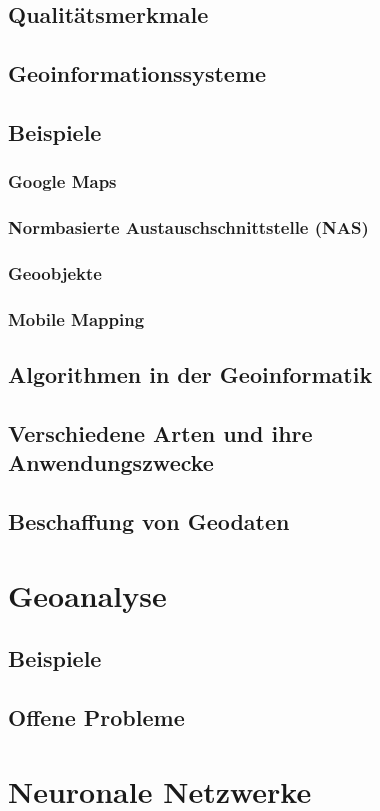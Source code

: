 \documentclass[11pt,fleqn]{book} %
\begin{document}
\section{Qualitätsmerkmale}
\section{Geoinformationssysteme}
\section{Beispiele}
\subsection{Google Maps}
\subsection{Normbasierte Austauschschnittstelle (NAS)}
\subsection{Geoobjekte}
\subsection{Mobile Mapping}
\section{Algorithmen in der Geoinformatik}

\section{Verschiedene Arten und ihre Anwendungszwecke}
\section{Beschaffung von Geodaten}
\chapter{Geoanalyse}
\section{Beispiele}
\section{Offene Probleme}
\chapter{Neuronale Netzwerke}
\end{document}
